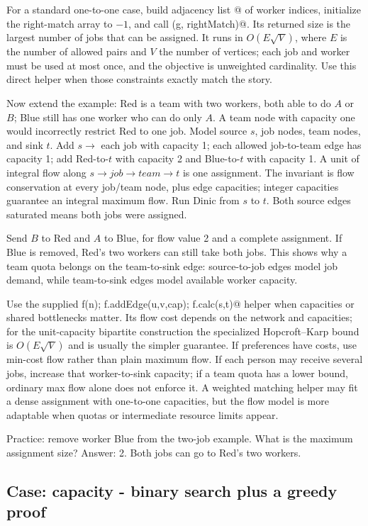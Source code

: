 For a standard one-to-one case, build adjacency list \verb@g[job]@ of worker
indices, initialize the right-match array to $-1$, and call
\verb@hopcroftKarp(g, rightMatch)@. Its returned size is the largest number
of jobs that can be assigned. It runs in $O(E\sqrt V)$, where $E$ is the
number of allowed pairs and $V$ the number of vertices; each job and worker
must be used at most once, and the objective is unweighted cardinality.
Use this direct helper when those constraints exactly match the story.

Now extend the example: Red is a team with two workers, both able to do $A$
or $B$; Blue still has one worker who can do only $A$. A team node with
capacity one would incorrectly restrict Red to one job. Model source $s$,
job nodes, team nodes, and sink $t$. Add $s\to$ each job with capacity 1;
each allowed job-to-team edge has capacity 1; add Red-to-$t$ with capacity 2
and Blue-to-$t$ with capacity 1. A unit of integral flow along
$s\to job\to team\to t$ is one assignment. The invariant is flow
conservation at every job/team node, plus edge capacities; integer
capacities guarantee an integral maximum flow. Run Dinic from $s$ to $t$.
Both source edges saturated means both jobs were assigned.

Send $B$ to Red and $A$ to Blue, for flow value 2 and a complete assignment.
If Blue is removed, Red's two workers can still take both jobs. This shows
why a team quota belongs on the team-to-sink edge: source-to-job edges model
job demand, while team-to-sink edges model available worker capacity.

Use the supplied \verb@Dinic f(n); f.addEdge(u,v,cap); f.calc(s,t)@ helper
when capacities or shared bottlenecks matter. Its flow cost depends on the
network and capacities; for the unit-capacity bipartite construction the
specialized Hopcroft--Karp bound is $O(E\sqrt V)$ and is usually the simpler
guarantee. If preferences have costs, use min-cost flow rather than plain
maximum flow. If each person may receive several jobs, increase that worker-to-sink
capacity; if a team quota has a lower bound, ordinary max flow alone does not
enforce it. A weighted matching helper may fit a dense assignment with
one-to-one capacities, but the flow model is more adaptable when quotas or
intermediate resource limits appear.

Practice: remove worker Blue from the two-job example. What is the maximum
assignment size? Answer: 2. Both jobs can go to Red's two workers.

\subsection{Case: capacity - binary search plus a greedy proof}
\label{case:capacity}

